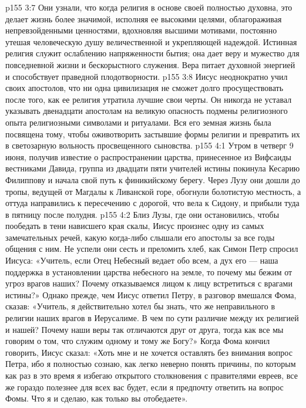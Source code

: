 \vs p155 3:7 Они узнали, что когда религия в основе своей полностью духовна, это делает жизнь более значимой, исполняя ее высокими целями, облагораживая непревзойденными ценностями, вдохновляя высшими мотивами, постоянно утешая человеческую душу величественной и укрепляющей надеждой. Истинная религия служит ослаблению напряженности бытия; она дает веру и мужество для повседневной жизни и бескорыстного служения. Вера питает духовной энергией и способствует праведной плодотворности.
\vs p155 3:8 Иисус неоднократно учил своих апостолов, что ни одна цивилизация не сможет долго просуществовать после того, как ее религия утратила лучшие свои черты. Он никогда не уставал указывать двенадцати апостолам на великую опасность подмены религиозного опыта религиозными символами и ритуалами. Вся его земная жизнь была посвящена тому, чтобы оживотворить застывшие формы религии и превратить их в светозарную вольность просвещенного сыновства.
\vs p155 4:1 Утром в четверг 9 июня, получив известие о распространении царства, принесенное из Вифсаиды вестниками Давида, группа из двадцати пяти учителей истины покинула Кесарию Филиппову и начала свой путь к финикийскому берегу. Через Лузу они дошли до тропы, ведущей от Магдалы к Ливанской горе, обогнули болотистую местность, а оттуда направились к пересечению с дорогой, что вела к Сидону, и прибыли туда в пятницу после полудня.
\vs p155 4:2 Близ Лузы, где они остановились, чтобы пообедать в тени нависшего края скалы, Иисус произнес одну из самых замечательных речей, какую когда\hyp{}либо слышали его апостолы за все годы общения с ним. Не успели они сесть и преломить хлеб, как Симон Петр спросил Иисуса: «Учитель, если Отец Небесный ведает обо всем, а дух его --- наша поддержка в установлении царства небесного на земле, то почему мы бежим от угроз врагов наших? Почему отказываемся лицом к лицу встретиться с врагами истины?» Однако прежде, чем Иисус ответил Петру, в разговор вмешался Фома, сказав: «Учитель, я действительно хотел бы знать, что же неправильного в религии наших врагов в Иерусалиме. В чем по сути различие между их религией и нашей? Почему наши веры так отличаются друг от друга, тогда как все мы говорим о том, что служим одному и тому же Богу?» Когда Фома кончил говорить, Иисус сказал: «Хоть мне и не хочется оставлять без внимания вопрос Петра, ибо я полностью сознаю, как легко неверно понять причины, по которым как раз в это время я избегаю открытого столкновения с правителями евреев, все же гораздо полезнее для всех вас будет, если я предпочту ответить на вопрос Фомы. Что я и сделаю, как только вы отобедаете».
